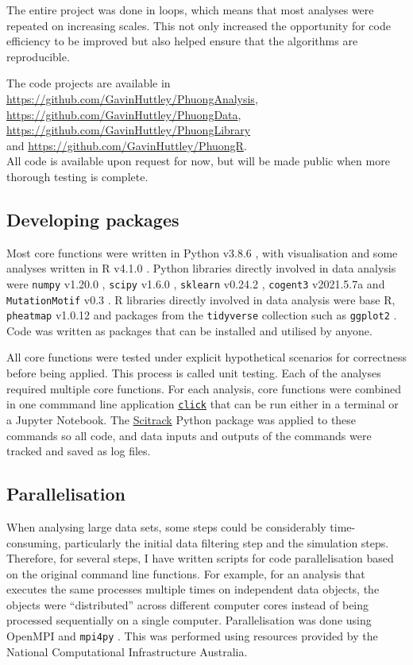 The entire project was done in loops, which means that most analyses were repeated on increasing scales. This not only increased the opportunity for code efficiency to be improved but also helped ensure that the algorithms are reproducible. 

The code projects are available in \\ \url{https://github.com/GavinHuttley/PhuongAnalysis}, \url{https://github.com/GavinHuttley/PhuongData}, \url{https://github.com/GavinHuttley/PhuongLibrary} \\ and \url{https://github.com/GavinHuttley/PhuongR}. \\ All code is available upon request for now, but will be made public when more thorough testing is complete. 

\subsection{Developing packages}
Most core functions were written in Python v3.8.6 \citep{van1995python}, with visualisation and some analyses written in R v4.1.0 \citep{r}. Python libraries directly involved in data analysis were \texttt{numpy} v1.20.0 \citep{harris2020array}, \texttt{scipy} v1.6.0 \citep{2020SciPy-NMeth}, \texttt{sklearn} v0.24.2 \citep{scikit-learn}, \texttt{cogent3} v2021.5.7a \citep{pycogent3} and \texttt{MutationMotif} v0.3 \citep{Zhu2017}. R libraries directly involved in data analysis were base R, \texttt{pheatmap} v1.0.12 \citep{pheatmap} and packages from the \texttt{tidyverse} collection such as \texttt{ggplot2} \citep{tidyverse}. Code was written as packages that can be installed and utilised by anyone.

All core functions were tested under explicit hypothetical scenarios for correctness before being applied. This process is called unit testing. Each of the analyses required multiple core functions. For each analysis, core functions were combined in one commmand line application \texttt{\href{https://click.palletsprojects.com/en/8.0.x/}{click}} that can be run either in a terminal or a Jupyter Notebook. The \href{https://github.com/HuttleyLab/scitrack}{Scitrack} Python package was applied to these commands so all code, and  data inputs and outputs of the commands were tracked and saved as log files.

\subsection{Parallelisation}
When analysing large data sets, some steps could be considerably time-consuming, particularly the initial data filtering step and the simulation steps. Therefore, for several steps, I have written scripts for code parallelisation based on the original command line functions. For example, for an analysis that executes the same processes multiple times on independent data objects, the objects were ``distributed'' across different computer cores instead of being processed sequentially on a single computer. Parallelisation was done using OpenMPI \citep{gabriel04:_open_mpi} and \texttt{mpi4py} \citep{Dalcin2011ParallelPython}. This was performed using resources provided by the National Computational Infrastructure Australia.


